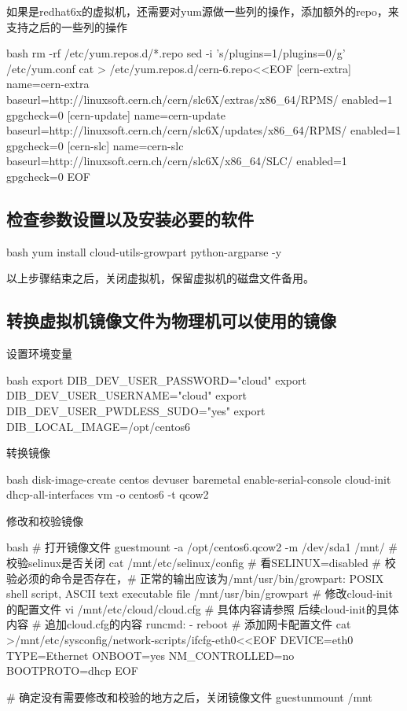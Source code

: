 如果是redhat6x的虚拟机，还需要对yum源做一些列的操作，添加额外的repo，来支持之后的一些列的操作
\begin{code-block}{bash}
rm -rf /etc/yum.repos.d/*.repo
sed -i 's/plugins=1/plugins=0/g' /etc/yum.conf
cat > /etc/yum.repos.d/cern-6.repo<<EOF
[cern-extra]
name=cern-extra
baseurl=http://linuxsoft.cern.ch/cern/slc6X/extras/x86_64/RPMS/
enabled=1
gpgcheck=0
[cern-update]
name=cern-update
baseurl=http://linuxsoft.cern.ch/cern/slc6X/updates/x86_64/RPMS/
enabled=1
gpgcheck=0
[cern-slc]
name=cern-slc
baseurl=http://linuxsoft.cern.ch/cern/slc6X/x86_64/SLC/
enabled=1
gpgcheck=0
EOF
\end{code-block}

\subsection{检查参数设置以及安装必要的软件}
\begin{code-block}{bash}
yum install cloud-utils-growpart python-argparse -y
\end{code-block}

以上步骤结束之后，关闭虚拟机，保留虚拟机的磁盘文件备用。

\subsection{转换虚拟机镜像文件为物理机可以使用的镜像}

设置环境变量
\begin{code-block}{bash}
export DIB_DEV_USER_PASSWORD="cloud"
export DIB_DEV_USER_USERNAME="cloud"
export DIB_DEV_USER_PWDLESS_SUDO="yes"
export DIB_LOCAL_IMAGE=/opt/centos6
\end{code-block}

转换镜像
\begin{code-block}{bash}
disk-image-create centos devuser baremetal enable-serial-console cloud-init dhcp-all-interfaces vm -o centos6 -t qcow2
\end{code-block}

修改和校验镜像
\begin{code-block}{bash}
# 打开镜像文件
guestmount -a /opt/centos6.qcow2 -m /dev/sda1 /mnt/
# 校验selinux是否关闭
cat /mnt/etc/selinux/config # 看SELINUX=disabled
# 校验必须的命令是否存在，# 正常的输出应该为/mnt/usr/bin/growpart: POSIX shell script, ASCII text executable
file /mnt/usr/bin/growpart
# 修改cloud-init的配置文件
vi /mnt/etc/cloud/cloud.cfg
# 具体内容请参照 后续cloud-init的具体内容
# 追加cloud.cfg的内容
runcmd:
 - reboot
# 添加网卡配置文件
cat >/mnt/etc/sysconfig/network-scripts/ifcfg-eth0<<EOF
DEVICE=eth0
TYPE=Ethernet
ONBOOT=yes
NM_CONTROLLED=no
BOOTPROTO=dhcp
EOF

# 确定没有需要修改和校验的地方之后，关闭镜像文件
guestunmount /mnt
\end{code-block}

